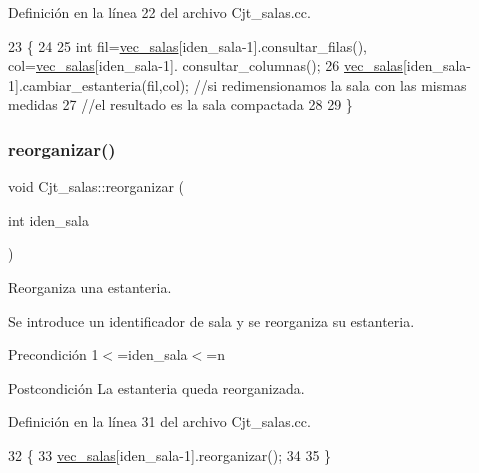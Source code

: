 Definición en la línea 22 del archivo Cjt\+\_\+salas.\+cc.


\begin{DoxyCode}
23 \{
24 
25     \textcolor{keywordtype}{int} fil=\hyperlink{class_cjt__salas_a3f130cc8bab35f449de8be69283af09e}{vec\_salas}[iden\_sala-1].consultar\_filas(), col=\hyperlink{class_cjt__salas_a3f130cc8bab35f449de8be69283af09e}{vec\_salas}[iden\_sala-1].
      consultar\_columnas();
26     \hyperlink{class_cjt__salas_a3f130cc8bab35f449de8be69283af09e}{vec\_salas}[iden\_sala-1].cambiar\_estanteria(fil,col); \textcolor{comment}{//si redimensionamos la sala con las
       mismas medidas}
27     \textcolor{comment}{//el resultado es la sala compactada}
28  
29 \}
\end{DoxyCode}
\mbox{\label{class_cjt__salas_a540d49e9ee9a7a078e18f610399335b6}} 
\subsubsection{\texorpdfstring{reorganizar()}{reorganizar()}}
{\footnotesize\ttfamily void Cjt\+\_\+salas\+::reorganizar (\begin{DoxyParamCaption}\item[{int}]{iden\+\_\+sala }\end{DoxyParamCaption})}



Reorganiza una estanteria. 

Se introduce un identificador de sala y se reorganiza su estanteria. \begin{DoxyPrecond}{Precondición}
1$<$=iden\+\_\+sala$<$=n 
\end{DoxyPrecond}
\begin{DoxyPostcond}{Postcondición}
La estanteria queda reorganizada. 
\end{DoxyPostcond}


Definición en la línea 31 del archivo Cjt\+\_\+salas.\+cc.


\begin{DoxyCode}
32 \{
33   \hyperlink{class_cjt__salas_a3f130cc8bab35f449de8be69283af09e}{vec\_salas}[iden\_sala-1].reorganizar();
34   
35 \}
\end{DoxyCode}
\mbox{\label{class_cjt__salas_af4a9c609def322edba117ae76aa0b3b9}} 
